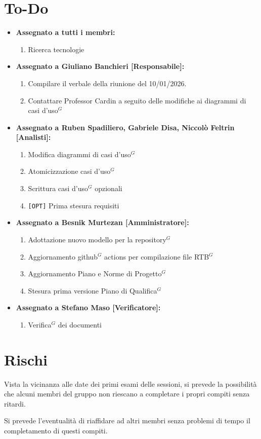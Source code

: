 \documentclass[a4paper,10pt]{article}
\begin{document}
\section*{To-Do}
\begin{itemize}
\item \textbf{Assegnato a tutti i membri:}
\begin{enumerate}
    \item Ricerca tecnologie
\end{enumerate}
\item \textbf{Assegnato a Giuliano Banchieri [Responsabile]:}
    \begin{enumerate}
    \item Compilare il verbale della riunione del 10/01/2026.
    \item Contattare Professor Cardin a seguito delle modifiche ai diagrammi di casi d'uso$^G$
    \end{enumerate}
\item \textbf{Assegnato a Ruben Spadiliero, Gabriele Disa, Niccolò Feltrin [Analisti]:}
    \begin{enumerate}
    \item Modifica diagrammi di casi d'uso$^G$
    \item Atomicizzazione casi d'uso$^G$
    \item Scrittura casi d'uso$^G$ opzionali
    \item \texttt{[OPT]} Prima stesura requisiti
    \end{enumerate}
\item \textbf{Assegnato a Besnik Murtezan [Amministratore]:}
    \begin{enumerate}
    \item Adottazione nuovo modello per la repository$^G$
    \item Aggiornamento github$^G$ actions per compilazione file RTB$^G$
    \item Aggiornamento Piano e Norme di Progetto$^G$
    \item Stesura prima versione Piano di Qualifica$^G$
    \end{enumerate}
\item \textbf{Assegnato a Stefano Maso [Verificatore]:}
    \begin{enumerate}
    \item Verifica$^G$ dei documenti
    \end{enumerate}
\end{itemize}

\section*{Rischi}
Vista la vicinanza alle date dei primi esami delle sessioni, si prevede la possibilità che alcuni membri del gruppo non riescano a completare i propri compiti senza ritardi.

Si prevede l'eventualità di riaffidare ad altri membri senza problemi di tempo il completamento di questi compiti.
\end{document}
